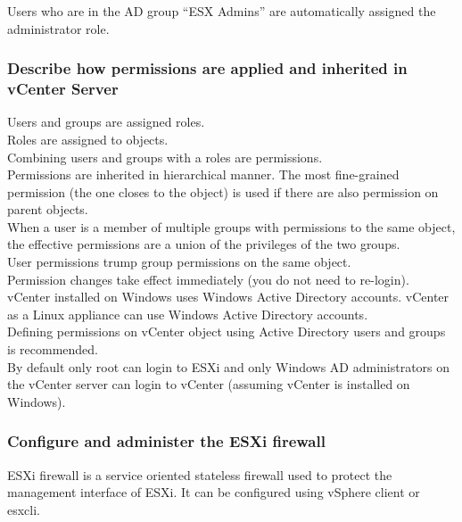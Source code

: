 Users who are in the AD group ``ESX Admins'' are automatically assigned the
administrator role.

\subsubsection{Describe how permissions are applied and inherited in vCenter Server}

Users and groups are assigned roles.\\

Roles are assigned to objects.\\

Combining users and groups with a roles are permissions.\\

Permissions are inherited in hierarchical manner. The most fine-grained
permission (the one closes to the object) is used if there are also
permission on parent objects.\\

When a user is a member of multiple groups with permissions to the same
object, the effective permissions are a union of the privileges of the two
groups.\\

User permissions trump group permissions on the same object.\\

Permission changes take effect immediately (you do not need to re-login).\\

vCenter installed on Windows uses Windows Active Directory accounts. vCenter
as a Linux appliance can use Windows Active Directory accounts.\\

Defining permissions on vCenter object using Active Directory users and groups
is recommended.\\

By default only root can login to ESXi and only Windows AD administrators on
the vCenter server can login to vCenter (assuming vCenter is installed on
Windows).\\

\subsubsection{Configure and administer the ESXi firewall}

ESXi firewall is a service oriented stateless firewall used to protect
the management interface of ESXi. It can be configured using vSphere client
or esxcli.\\

